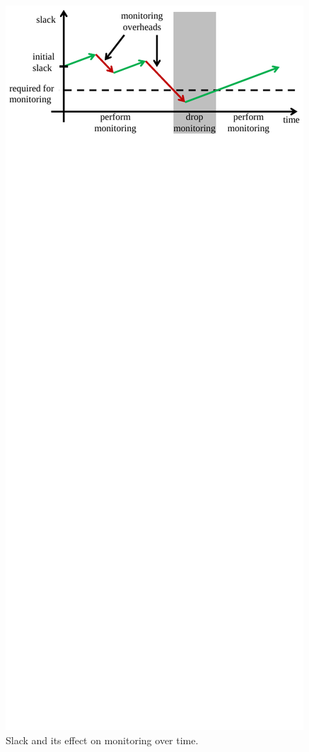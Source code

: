 \begin{figure}
  \begin{center}
    \includegraphics[width=\columnwidth]{figs/slack.pdf}
    \vspace{-0.3in}
    \caption{Slack and its effect on monitoring over time.}
    \label{fig:drop.slack}
    \vspace{-0.2in}
  \end{center}
\end{figure}

